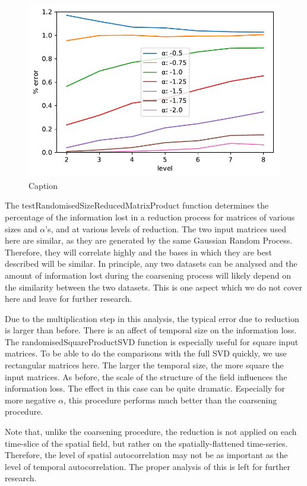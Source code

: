 \documentclass{acm_proc_article-sp}
\begin{document}
\begin{figure}[h]
\begin{center}
\includegraphics[width=0.8\columnwidth]{Results/plotRandomisedSizeReducedMatrixProduct.pdf}
\caption[Small caption]{Caption}
\label{fig:plotRandomisedSizeReducedMatrixProduct}
\end{center}
\end{figure}
The testRandomisedSizeReducedMatrixProduct function determines the percentage of the information lost in a reduction process for matrices of various sizes and $\alpha$'s, and at various levels of reduction. The two input matrices used here are similar, as they are generated by the same Gaussian Random Process. Therefore, they will correlate highly and the bases in which they are best described will be similar. In principle, any two datasets can be analysed and the amount of information lost during the coarsening process will likely depend on the similarity between the two datasets. This is one aspect which we do not cover here and leave for further research.

Due to the multiplication step in this analysis, the typical error due to reduction is larger than before. There is an affect of temporal size on the information loss. The randomisedSquareProductSVD function is especially useful for square input matrices. To be able to do the comparisons with the full SVD quickly, we use rectangular matrices here. The larger the temporal size, the more square the input matrices. As before, the scale of the structure of the field influences the information loss. The effect in this case can be quite dramatic. Especially for more negative $\alpha$, this procedure performs much better than the coarsening procedure.

Note that, unlike the coarsening procedure, the reduction is not applied on each time-slice of the spatial field, but rather on the spatially-flattened time-series. Therefore, the level of spatial autocorrelation may not be as important as the level of temporal autocorrelation. The proper analysis of this is left for further research.
\end{document}
